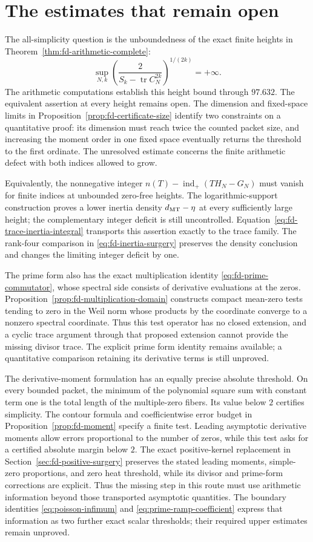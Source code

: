 \section{The estimates that remain open}
The all-simplicity question is the unboundedness of the exact finite
heights in Theorem~\ref{thm:fd-arithmetic-complete}:
\[
 \sup_{N,k}\left(\frac2{S_k-\operatorname{tr}C_N^{2k}}\right)^{1/(2k)}
          =+\infty.
\]
The arithmetic computations establish this height bound through
$97.632$. The equivalent assertion at every height remains open.
The dimension and fixed-space limits in
Proposition~\ref{prop:fd-certificate-size} identify two constraints
on a quantitative proof: its dimension must reach twice the counted
packet size, and increasing the moment order in one fixed space
eventually returns the threshold to the first ordinate. The unresolved
estimate concerns the finite arithmetic defect with both indices
allowed to grow.

Equivalently, the nonnegative integer
\(n(T)-\operatorname{ind}_+(T H_N-G_N)\) must vanish for finite
indices at unbounded zero-free heights. The logarithmic-support
construction proves a lower inertia density \(d_{\rm MT}-\eta\)
at every sufficiently large height; the complementary integer deficit
is still uncontrolled. Equation~\eqref{eq:fd-trace-inertia-integral}
transports this assertion exactly to the trace family. The rank-four
comparison in \eqref{eq:fd-inertia-surgery} preserves the density
conclusion and changes the limiting integer deficit by one.

The prime form also has the exact multiplication identity
\eqref{eq:fd-prime-commutator}, whose spectral side consists of
derivative evaluations at the zeros. Proposition~\ref{prop:fd-multiplication-domain}
constructs compact mean-zero tests tending to zero in the Weil norm
whose products by the coordinate converge to a nonzero spectral
coordinate. Thus this test operator has no closed extension, and a
cyclic trace argument through that proposed extension cannot provide
the missing divisor trace. The explicit prime form identity remains
available; a quantitative comparison retaining its derivative terms is
still unproved.

The derivative-moment formulation has an equally precise absolute
threshold. On every bounded packet, the minimum of the polynomial
square sum with constant term one is the total length of the
multiple-zero fibers. Its value below $2$ certifies simplicity.
The contour formula and coefficientwise error budget in
Proposition~\ref{prop:fd-moment} specify a finite test. Leading
asymptotic derivative moments allow errors proportional to the
number of zeros, while this test asks for a certified absolute
margin below $2$. The exact positive-kernel replacement in
Section~\ref{sec:fd-positive-surgery} preserves the stated leading
moments, simple-zero proportions, and zero heat threshold, while
its divisor and prime-form corrections are explicit. Thus the
missing step in this route must use arithmetic information beyond
those transported asymptotic quantities. The boundary identities
\eqref{eq:poisson-infimum} and \eqref{eq:prime-ramp-coefficient}
express that information as two further exact scalar thresholds;
their required upper estimates remain unproved.

